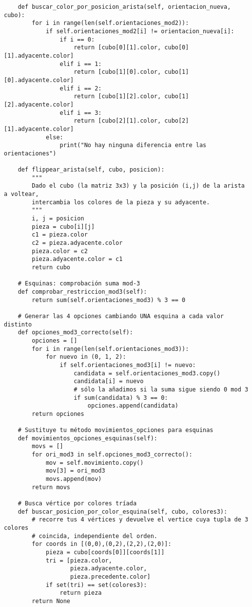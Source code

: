 \begin{lstlisting}
    def buscar_color_por_posicion_arista(self, orientacion_nueva, cubo):
        for i in range(len(self.orientaciones_mod2)):
            if self.orientaciones_mod2[i] != orientacion_nueva[i]:
                if i == 0:
                    return [cubo[0][1].color, cubo[0][1].adyacente.color]
                elif i == 1:
                    return [cubo[1][0].color, cubo[1][0].adyacente.color]
                elif i == 2:
                    return [cubo[1][2].color, cubo[1][2].adyacente.color]
                elif i == 3:
                    return [cubo[2][1].color, cubo[2][1].adyacente.color]
            else:
                print("No hay ninguna diferencia entre las orientaciones")
                
    def flippear_arista(self, cubo, posicion):
        """
        Dado el cubo (la matriz 3x3) y la posición (i,j) de la arista a voltear,
        intercambia los colores de la pieza y su adyacente.
        """
        i, j = posicion
        pieza = cubo[i][j]
        c1 = pieza.color
        c2 = pieza.adyacente.color
        pieza.color = c2
        pieza.adyacente.color = c1
        return cubo
    
    # Esquinas: comprobación suma mod-3
    def comprobar_restriccion_mod3(self):
        return sum(self.orientaciones_mod3) % 3 == 0

    # Generar las 4 opciones cambiando UNA esquina a cada valor distinto
    def opciones_mod3_correcto(self):
        opciones = []
        for i in range(len(self.orientaciones_mod3)):
            for nuevo in (0, 1, 2):
                if self.orientaciones_mod3[i] != nuevo:
                    candidata = self.orientaciones_mod3.copy()
                    candidata[i] = nuevo
                    # sólo la añadimos si la suma sigue siendo 0 mod 3
                    if sum(candidata) % 3 == 0:
                        opciones.append(candidata)
        return opciones

    # Sustituye tu método movimientos_opciones para esquinas
    def movimientos_opciones_esquinas(self):
        movs = []
        for ori_mod3 in self.opciones_mod3_correcto():
            mov = self.movimiento.copy()
            mov[3] = ori_mod3
            movs.append(mov)
        return movs

    # Busca vértice por colores tríada
    def buscar_posicion_por_color_esquina(self, cubo, colores3):
        # recorre tus 4 vértices y devuelve el vertice cuya tupla de 3 colores
        # coincida, independiente del orden.
        for coords in [(0,0),(0,2),(2,2),(2,0)]:
            pieza = cubo[coords[0]][coords[1]]
            tri = [pieza.color,
                   pieza.adyacente.color,
                   pieza.precedente.color]
            if set(tri) == set(colores3):
                return pieza
        return None
    

\end{lstlisting}

